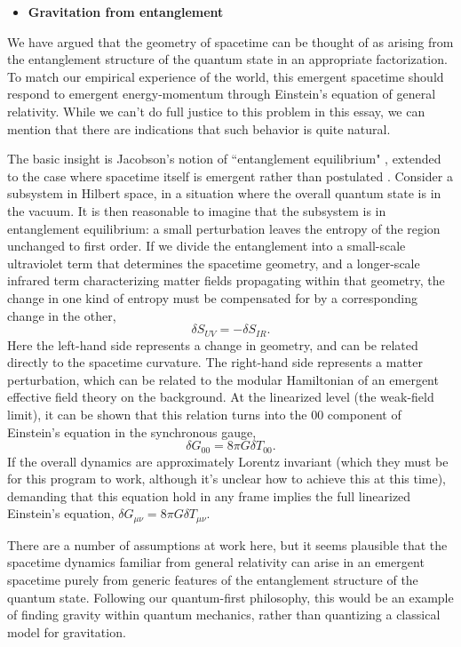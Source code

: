 \documentclass[12pt,english]{article}
\newcommand{\be}{\begin{equation}}
\newcommand{\ee}{\end{equation}}
\begin{document}
\begin{itemize}
\item \textbf{Gravitation from entanglement}
\end{itemize}

We have argued that the geometry of spacetime can be thought of as arising from the entanglement structure of the quantum state in an appropriate factorization.
To match our empirical experience of the world, this emergent spacetime should respond to emergent energy-momentum through Einstein's equation of general relativity.
While we can't do full justice to this problem in this essay, we can mention that there are indications that such behavior is quite natural.

The basic insight is Jacobson's notion of ``entanglement equilibrium" \cite{Jacobson:2015hqa}, extended to the case where spacetime itself is emergent rather than postulated \cite{Cao:2017hrv}.
Consider a subsystem in Hilbert space, in a situation where the overall quantum state is in the vacuum.
It is then reasonable to imagine that the subsystem is in entanglement equilibrium: a small perturbation leaves the entropy of the region unchanged to first order.
If we divide the entanglement into a small-scale ultraviolet term that determines the spacetime geometry, and a longer-scale infrared term characterizing matter fields propagating within that geometry, the change in one kind of entropy must be compensated for by a corresponding change in the other,
\be
  \delta S_{UV} = - \delta S_{IR}.
\ee
Here the left-hand side represents a change in geometry, and can be related directly to the spacetime curvature.
The right-hand side represents a matter perturbation, which can be related to the modular Hamiltonian of an emergent effective field theory on the background.
At the linearized level (the weak-field limit), it can be shown that this relation turns into the $00$ component of Einstein's equation in the synchronous gauge,
\be
  \delta G_{00} = 8\pi G \delta T_{00}.
\ee
If the overall dynamics are approximately Lorentz invariant (which they must be for this program to work, although it's unclear how to achieve this at this time), demanding that this equation hold in any frame implies the full linearized Einstein's equation, $\delta G_{\mu\nu} = 8\pi G \delta T_{\mu\nu}$.

There are a number of assumptions at work here, but it seems plausible that the spacetime dynamics familiar from general relativity can arise in an emergent spacetime purely from generic features of the entanglement structure of the quantum state.
Following our quantum-first philosophy, this would be an example of finding gravity within quantum mechanics, rather than quantizing a classical model for gravitation.
\end{document}
